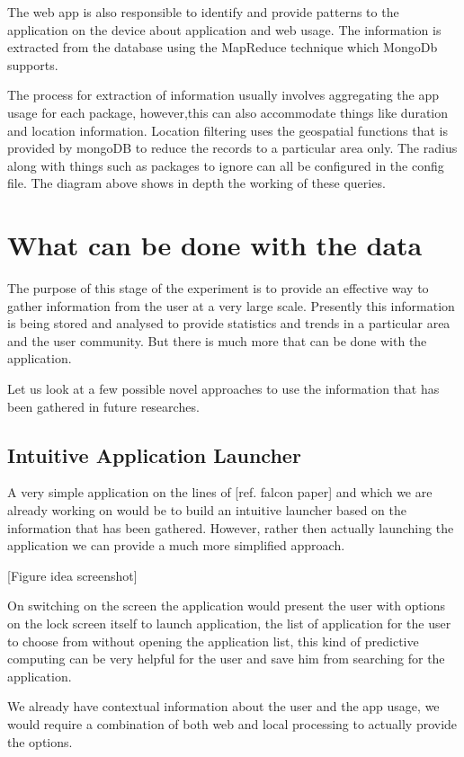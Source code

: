 \documentclass[12pt]{report}
\begin{document}
The web app is also responsible to identify and provide patterns to the application on the device about application and web usage. The information is extracted from the database using the MapReduce technique which MongoDb supports. 

The process for extraction of information usually involves aggregating the app usage for each package, however,this can also accommodate things like duration and location information. Location filtering uses the geospatial functions that is provided by mongoDB to reduce the records to a particular area only. The radius along with things such as packages to ignore can all be configured in the config file. The diagram above shows in depth the working of these queries.

\chapter{What can be done with the data}
The purpose of this stage of the experiment is to provide an effective way to gather information from the user at a very large scale. Presently this information is being stored and analysed to provide statistics and trends in a particular area and the user community. But there is much more that can be done with the application.

Let us look at a few possible novel approaches to use the information that has been gathered in future researches.

\section{Intuitive Application Launcher}

A very simple application on the lines of [ref. falcon paper] and which we are already working on would be to build an intuitive launcher based on the information that has been gathered. However, rather then actually launching the application we can provide a much more simplified approach.

[Figure idea screenshot]

On switching on the screen the application would present the user with options on the lock screen itself to launch application, the list of application for the user to choose from without opening the application list, this kind of predictive computing can be very helpful for the user and save him from searching for the application.

We already have contextual information about the user and the app usage, we would require a combination of both web and local processing to actually provide the options.
\end{document}
